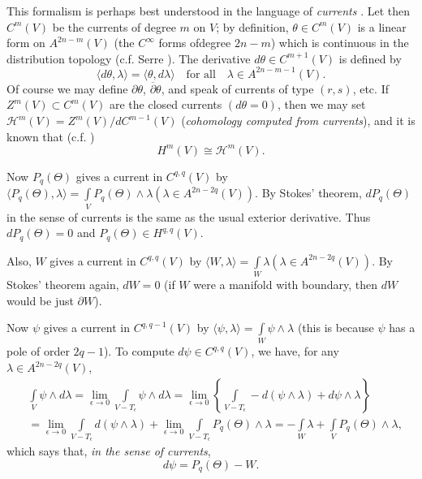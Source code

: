 This formalism is perhaps best understood in the language of {\em currents} \cite{art08-key14}. Let then $C^{m}(V)$ be the currents of degree $m$ on $V$; by definition, $\theta\in C^{m}(V)$ is a linear form on $A^{2n-m}(V)$ (the $C^{\infty}$ forms of\pageoriginale degree $2n-m$) which is continuous in the distribution topology (c.f. Serre \cite{art08-key21}). The derivative $d\theta\in C^{m+1}(V)$ is defined by
\begin{equation*}
\langle d\theta,\lambda\rangle =\langle \theta,d\lambda\rangle \text{~~ for all~~ } \lambda\in A^{2n-m-1}(V).\tag{A4.44}\label{art08-sec4-eqA4.44}
\end{equation*}
Of course we may define $\partial \theta$, $\overline{\partial}\theta$, and speak of currents of type $(r,s)$, etc. If $Z^{m}(V)\subset C^{m}(V)$ are the closed currents $(d\theta=0)$, then we may set $\mathscr{H}^{m}(V)=Z^{m}(V)/dC^{m-1}(V)$ ({\em cohomology computed from currents}), and it is known that (c.f. \cite{art08-key14})
\begin{equation*}
H^{m}(V)\cong \mathscr{H}^{m}(V).\tag{A4.45}\label{art08-sec4-eqA4.45}
\end{equation*}

Now $P_{q}(\Theta)$ gives a current in $C^{q,q}(V)$ by $\langle P_{q}(\Theta),\lambda\rangle=\int\limits_{V}P_{q}(\Theta)\wedge \lambda (\lambda\in A^{2n-2q}(V))$. By Stokes' theorem, $dP_{q}(\Theta)$ in the sense of currents is the same as the usual exterior derivative. Thus $dP_{q}(\Theta)=0$ and $P_{q}(\Theta)\in H^{q,q}(V)$.

Also, $W$ gives a current in $C^{q,q}(V)$ by $\langle W,\lambda\rangle=\int\limits_{W}\lambda(\lambda\in A^{2n-2q}(V))$. By Stokes' theorem again, $dW=0$ (if $W$ were a manifold with boundary, then $dW$ would be just $\partial W$).

Now $\psi$ gives a current in $C^{q,q-1}(V)$ by $\langle \psi,\lambda\rangle=\int\limits_{W}\psi\wedge\lambda$ (this is because $\psi$ has a pole of order $2q-1$). To compute $d\psi\in C^{q,q}(V)$, we have, for any $\lambda\in A^{2n-2q}(V)$,
\begin{align*}
& \int\limits_{V}\psi\wedge d\lambda=\lim\limits_{\epsilon\to 0}\int\limits_{V-T_{\epsilon}}\psi\wedge d\lambda=\lim\limits_{\epsilon\to 0}\left\{\int\limits_{V-T_{\epsilon}}-d(\psi\wedge\lambda)+d\psi\wedge\lambda\right\}\\[4pt]
&=\lim\limits_{\epsilon\to 0}\int\limits_{V-T_{\epsilon}}d(\psi\wedge\lambda)+\lim\limits_{\epsilon\to 0}\int\limits_{V-T_{\epsilon}}P_{q}(\Theta)\wedge\lambda=-\int\limits_{W}\lambda+\int\limits_{V}P_{q}(\Theta)\wedge\lambda,
\end{align*}
which says that, {\em in the sense of currents},
\begin{equation*}
d\psi=P_{q}(\Theta)-W.\tag{A4.45}\label{art08-sec4-add-eqA4.45}
\end{equation*}

